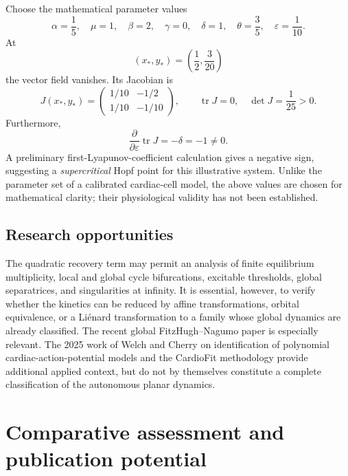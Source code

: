 \documentclass[11pt,a4paper]{article}
\begin{document}
Choose the mathematical parameter values
\[
\alpha=\frac15,\quad \mu=1,\quad
\beta=2,\quad\gamma=0,\quad
\delta=1,\quad\theta=\frac35,\quad
\varepsilon=\frac1{10}.
\]
At
\[
(x_*,y_*)=\left(\frac12,\frac3{20}\right)
\]
the vector field vanishes. Its Jacobian is
\begin{equation}
J(x_*,y_*)=\begin{pmatrix}
 1/10 & -1/2\\
 1/10 & -1/10
\end{pmatrix},
\qquad
\operatorname{tr}J=0,\quad
\det J=\frac1{25}>0.
\end{equation}
Furthermore,
\[
\frac{\partial}{\partial\varepsilon}\operatorname{tr}J
=-\delta=-1\ne0.
\]
A preliminary first-Lyapunov-coefficient calculation gives a negative sign, suggesting a \emph{supercritical} Hopf point for this illustrative system. Unlike the parameter set of a calibrated cardiac-cell model, the above values are chosen for mathematical clarity; their physiological validity has not been established.

\subsection{Research opportunities}

The quadratic recovery term may permit an analysis of finite equilibrium multiplicity, local and global cycle bifurcations, excitable thresholds, global separatrices, and singularities at infinity. It is essential, however, to verify whether the kinetics can be reduced by affine transformations, orbital equivalence, or a Li\'enard transformation to a family whose global dynamics are already classified. The recent global FitzHugh--Nagumo paper \cite{ChenLiXiao2026} is especially relevant. The 2025 work of Welch and Cherry on identification of polynomial cardiac-action-potential models \cite{WelchCherry2025} and the CardioFit methodology \cite{CairnsEtAl2025} provide additional applied context, but do not by themselves constitute a complete classification of the autonomous planar dynamics.

\section{Comparative assessment and publication potential}
\end{document}
